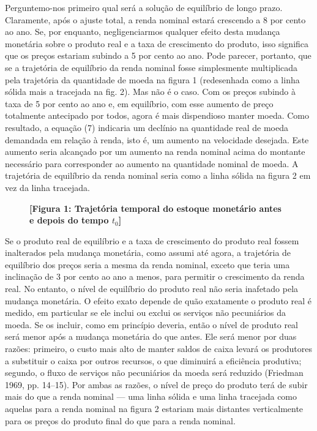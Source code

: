 \documentclass[12pt]{article}
\begin{document}
Perguntemo-nos primeiro qual será a solução de equilíbrio de longo prazo. Claramente, após o ajuste total, a renda nominal estará crescendo a 8 por cento ao ano. Se, por enquanto, negligenciarmos qualquer efeito desta mudança monetária sobre o produto real e a taxa de crescimento do produto, isso significa que os preços estariam subindo a 5 por cento ao ano. Pode parecer, portanto, que se a trajetória de equilíbrio da renda nominal fosse simplesmente multiplicada pela trajetória da quantidade de moeda na figura 1 (redesenhada como a linha sólida mais a tracejada na fig. 2). Mas não é o caso. Com os preços subindo à taxa de 5 por cento ao ano e, em equilíbrio, com esse aumento de preço totalmente antecipado por todos, agora é mais dispendioso manter moeda. Como resultado, a equação (7) indicaria um declínio na quantidade real de moeda demandada em relação à renda, isto é, um aumento na velocidade desejada. Este aumento seria alcançado por um aumento na renda nominal acima do montante necessário para corresponder ao aumento na quantidade nominal de moeda. A trajetória de equilíbrio da renda nominal seria como a linha sólida na figura 2 em vez da linha tracejada.

\begin{figure}[h]
\centering
\textbf{[Figura 1: Trajetória temporal do estoque monetário antes e depois do tempo $t_0$]}
\end{figure}

Se o produto real de equilíbrio e a taxa de crescimento do produto real fossem inalterados pela mudança monetária, como assumi até agora, a trajetória de equilíbrio dos preços seria a mesma da renda nominal, exceto que teria uma inclinação de 3 por cento ao ano a menos, para permitir o crescimento da renda real. No entanto, o nível de equilíbrio do produto real não seria inafetado pela mudança monetária. O efeito exato depende de quão exatamente o produto real é medido, em particular se ele inclui ou exclui os serviços não pecuniários da moeda. Se os incluir, como em princípio deveria, então o nível de produto real será menor após a mudança monetária do que antes. Ele será menor por duas razões: primeiro, o custo mais alto de manter saldos de caixa levará os produtores a substituir o caixa por outros recursos, o que diminuirá a eficiência produtiva; segundo, o fluxo de serviços não pecuniários da moeda será reduzido (Friedman 1969, pp. 14–15). Por ambas as razões, o nível de preço do produto terá de subir mais do que a renda nominal — uma linha sólida e uma linha tracejada como aquelas para a renda nominal na figura 2 estariam mais distantes verticalmente para os preços do produto final do que para a renda nominal.
\end{document}

